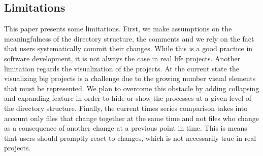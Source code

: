 \subsection{Limitations}
\label{subsec:threats}

This paper presents some limitations. First, we make assumptions on the meaningfulness of the directory structure, the comments and we rely on the fact that users systematically commit their changes. While this is a good practice in software development, it is not always the case in real life projects. 
Another limitation regards the visualization of the projects. At the current state the visualizing big projects is a challenge due to the growing number visual elements that must be represented. We plan to overcome this obstacle by adding collapsing and expanding feature in order to hide or show the processes at a given level of the directory structure.
Finally, the current times series comparison takes into account only files that change together at the same time and not files who change as a consequence of another change at a previous point in time. This is means that users should promptly react to changes, which is not necessarily true in real projects. 